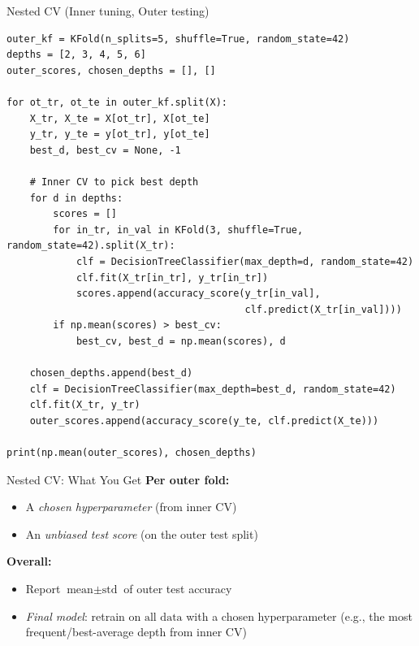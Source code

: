 \documentclass{beamer}
\begin{document}
	\begin{frame}[fragile]{Nested CV (Inner tuning, Outer testing)}
\tiny
\begin{verbatim}
outer_kf = KFold(n_splits=5, shuffle=True, random_state=42)
depths = [2, 3, 4, 5, 6]
outer_scores, chosen_depths = [], []

for ot_tr, ot_te in outer_kf.split(X):
    X_tr, X_te = X[ot_tr], X[ot_te]
    y_tr, y_te = y[ot_tr], y[ot_te]
    best_d, best_cv = None, -1

    # Inner CV to pick best depth
    for d in depths:
        scores = []
        for in_tr, in_val in KFold(3, shuffle=True, random_state=42).split(X_tr):
            clf = DecisionTreeClassifier(max_depth=d, random_state=42)
            clf.fit(X_tr[in_tr], y_tr[in_tr])
            scores.append(accuracy_score(y_tr[in_val],
                                         clf.predict(X_tr[in_val])))
        if np.mean(scores) > best_cv:
            best_cv, best_d = np.mean(scores), d

    chosen_depths.append(best_d)
    clf = DecisionTreeClassifier(max_depth=best_d, random_state=42)
    clf.fit(X_tr, y_tr)
    outer_scores.append(accuracy_score(y_te, clf.predict(X_te)))

print(np.mean(outer_scores), chosen_depths)
\end{verbatim}
\end{frame}

\begin{frame}{Nested CV: What You Get}
\textbf{Per outer fold:}
\begin{itemize}
  \item A \emph{chosen hyperparameter} (from inner CV)
  \item An \emph{unbiased test score} (on the outer test split)
\end{itemize}

\textbf{Overall:}
\begin{itemize}
  \item Report \(\text{mean} \pm \text{std}\) of outer test accuracy
  \item \emph{Final model}: retrain on \(\text{all data}\) with a chosen hyperparameter (e.g., the most frequent/best-average depth from inner CV)
\end{itemize}
\end{frame}



\end{document}
